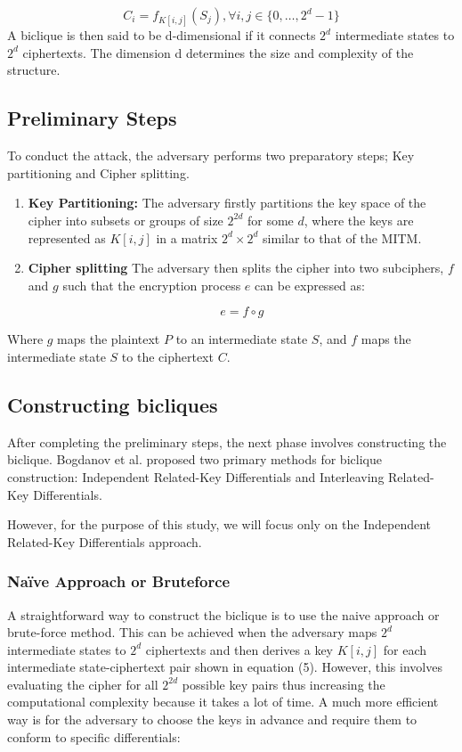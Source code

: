 \documentclass{report}
\begin{document}
\begin{equation}
C_i = f_{K[i, j]}(S_j), \forall i, j \in \{0, \ldots, 2^d - 1\}
\end{equation}
A biclique is then said to be d-dimensional if it connects $2^d$ intermediate states to $2^d$ ciphertexts. The dimension d determines the size and complexity of the structure. 

\subsection{Preliminary Steps}
To conduct the attack, the adversary performs two preparatory steps; Key partitioning and Cipher splitting.

\begin{enumerate}
    \item \textbf{Key Partitioning:}
    The adversary firstly partitions the key space of the cipher into subsets or groups of size $2^{2d}$ for some $d$, where the keys are represented as $K[i, j]$ in a matrix $2^d \times 2^d$ similar to that of the MITM.

    \item \textbf{Cipher splitting}
    The adversary then splits the cipher into two subciphers, $f$ and $g$ such that the encryption process $e$ can be expressed as:
    
    \begin{equation}
        e = f \circ g
    \end{equation}
    
\end{enumerate}
Where $g$ maps the plaintext $P$ to an intermediate state $S$, and $f$ maps the intermediate state $S$ to the ciphertext $C$.


\subsection{Constructing bicliques}
After completing the preliminary steps, the next phase involves constructing the biclique. Bogdanov et al. proposed two primary methods for biclique construction: Independent Related-Key Differentials and Interleaving Related-Key Differentials.

However, for the purpose of this study, we will focus only on the Independent Related-Key Differentials approach.

\subsubsection{Naïve Approach or Bruteforce}
A straightforward way to construct the biclique is to use the naive approach or brute-force method. This can be achieved when the adversary maps $2^d$ intermediate states to $2^d$ ciphertexts and then derives a key $K[i, j]$ for each intermediate state-ciphertext pair shown in equation (5). However, this involves evaluating the cipher for all $2^{2d}$ possible key pairs thus increasing the computational complexity because it takes a lot of time. A much more efficient way is for the adversary to choose the keys in advance and require them to conform to specific differentials:
\end{document}

